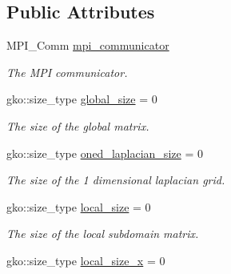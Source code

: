 \subsection*{Public Attributes}
\begin{DoxyCompactItemize}
\item 
\mbox{\label{structschwz_1_1Metadata_a84a525a7a5f5282dcc1ef165e93bad35}} 
M\+P\+I\+\_\+\+Comm \hyperlink{structschwz_1_1Metadata_a84a525a7a5f5282dcc1ef165e93bad35}{mpi\+\_\+communicator}
\begin{DoxyCompactList}\small\item\em The M\+PI communicator. \end{DoxyCompactList}\item 
\mbox{\label{structschwz_1_1Metadata_a9c8057649291f015a29e246dc9b0dca4}} 
gko\+::size\+\_\+type \hyperlink{structschwz_1_1Metadata_a9c8057649291f015a29e246dc9b0dca4}{global\+\_\+size} = 0
\begin{DoxyCompactList}\small\item\em The size of the global matrix. \end{DoxyCompactList}\item 
\mbox{\label{structschwz_1_1Metadata_a1333605c0573688ce4d71173f52ef2b4}} 
gko\+::size\+\_\+type \hyperlink{structschwz_1_1Metadata_a1333605c0573688ce4d71173f52ef2b4}{oned\+\_\+laplacian\+\_\+size} = 0
\begin{DoxyCompactList}\small\item\em The size of the 1 dimensional laplacian grid. \end{DoxyCompactList}\item 
\mbox{\label{structschwz_1_1Metadata_a1e24cc843abc923c309fb74243323d8c}} 
gko\+::size\+\_\+type \hyperlink{structschwz_1_1Metadata_a1e24cc843abc923c309fb74243323d8c}{local\+\_\+size} = 0
\begin{DoxyCompactList}\small\item\em The size of the local subdomain matrix. \end{DoxyCompactList}\item 
\mbox{\label{structschwz_1_1Metadata_a64639c8f3ff4c240e50a3862e95303dc}} 
gko\+::size\+\_\+type \hyperlink{structschwz_1_1Metadata_a64639c8f3ff4c240e50a3862e95303dc}{local\+\_\+size\+\_\+x} = 0

\end{DoxyCompactItemize}
